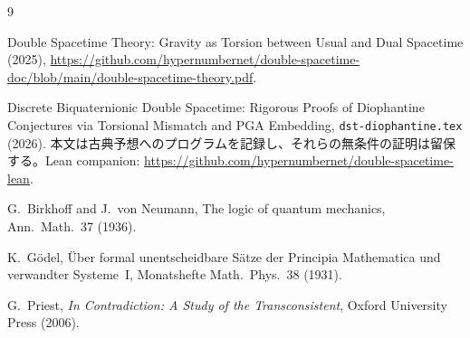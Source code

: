 \documentclass[a4paper]{article}
\theoremstyle{definition}
\begin{document}
\begin{thebibliography}{9}
\raggedright

Double Spacetime Theory: Gravity as Torsion between Usual and Dual Spacetime (2025),
\url{https://github.com/hypernumbernet/double-spacetime-doc/blob/main/double-spacetime-theory.pdf}.

Discrete Biquaternionic Double Spacetime: Rigorous Proofs of Diophantine
Conjectures via Torsional Mismatch and PGA Embedding,
\texttt{dst-diophantine.tex} (2026).
本文は古典予想へのプログラムを記録し、それらの無条件の証明は留保する。Lean companion:
\url{https://github.com/hypernumbernet/double-spacetime-lean}.

G.~Birkhoff and J.~von Neumann, The logic of quantum mechanics,
Ann.\ Math.\ 37 (1936).

K.~G\"odel, \"Uber formal unentscheidbare S\"atze der Principia Mathematica
und verwandter Systeme~I, Monatshefte Math.\ Phys.\ 38 (1931).

G.~Priest, \emph{In Contradiction: A Study of the Transconsistent},
Oxford University Press (2006).

\end{thebibliography}
\end{document}
